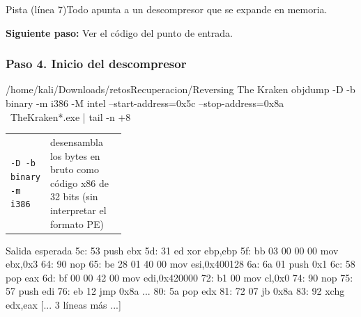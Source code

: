 \documentclass[11pt,a4paper]{article}
\begin{document}
\begin{pista}{Pista (línea 7)}Todo apunta a un descompresor que se expande en memoria.\par\smallskip\textbf{Siguiente paso:} Ver el código del punto de entrada.\end{pista}

\subsubsection*{Paso 4. Inicio del descompresor}
\begin{comando}{/home/kali/Downloads/retosRecuperacion/Reversing The Kraken}
objdump -D -b binary -m i386 -M intel --start-address=0x5c --stop-address=0x8a \
  TheKraken*.exe | tail -n +8
\end{comando}
\begin{tcolorbox}[enhanced, breakable, colback=white, colframe=gray!40, boxrule=0.3pt, arc=1pt, left=4pt, right=4pt, top=2pt, bottom=2pt, fonttitle=\sffamily\scriptsize\bfseries, coltitle=black!75, colbacktitle=gray!8, title={Qué hace cada parte}, attach title to upper, before skip=2pt, after skip=4pt, fontupper=\small]
\par{\renewcommand{\arraystretch}{1.12}\begin{tabularx}{\linewidth}{@{}>{\raggedright\arraybackslash}p{0.33\linewidth}>{\raggedright\arraybackslash}X@{}}
\texttt{-D -b binary -m i386} & desensambla los bytes en bruto como código x86 de 32 bits (sin interpretar el formato PE) \\
\end{tabularx}}
\end{tcolorbox}
\begin{salidan}{Salida esperada}
  5c:   53                      push   ebx
  5d:   31 ed                   xor    ebp,ebp
  5f:   bb 03 00 00 00          mov    ebx,0x3
  64:   90                      nop
  65:   be 28 01 40 00          mov    esi,0x400128
  6a:   6a 01                   push   0x1
  6c:   58                      pop    eax
  6d:   bf 00 00 42 00          mov    edi,0x420000
  72:   b1 00                   mov    cl,0x0
  74:   90                      nop
  75:   57                      push   edi
  76:   eb 12                   jmp    0x8a
        ...
  80:   5a                      pop    edx
  81:   72 07                   jb     0x8a
  83:   92                      xchg   edx,eax
[... 3 líneas más ...]
\end{salidan}
\end{document}
